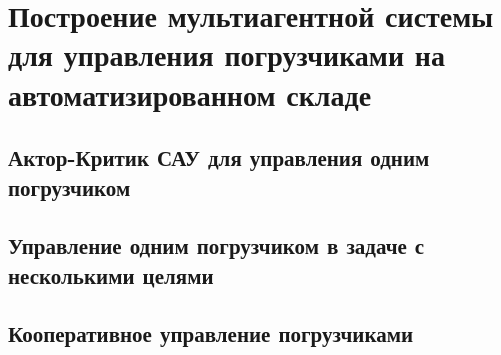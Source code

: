 \chapter{Построение мультиагентной системы для управления погрузчиками на автоматизированном складе} \label{chapt4}

\section{Актор-Критик САУ для управления одним погрузчиком } \label{subsect4_1}

\section{Управление одним погрузчиком в задаче с несколькими целями} \label{subsect4_2}

\section{Кооперативное управление погрузчиками} \label{subsect4_3}
\clearpage
\clearpage
